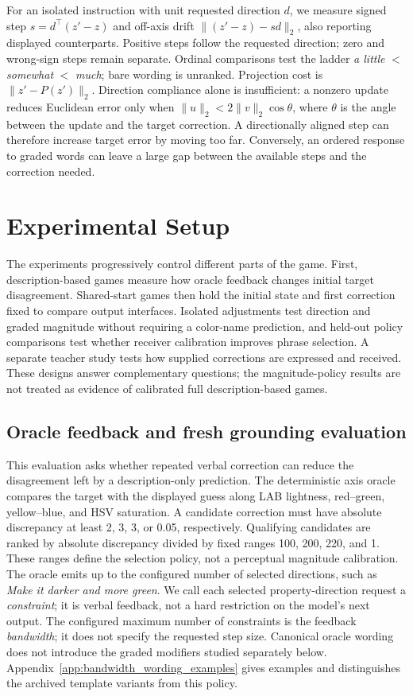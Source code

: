 \documentclass[11pt]{article}
\begin{document}
For an isolated instruction with unit requested direction $d$, we measure
signed step $s=d^\top(z'-z)$ and off-axis drift
$\|(z'-z)-sd\|_2$, also reporting displayed counterparts.
Positive steps follow the requested direction; zero and wrong-sign steps
remain separate. Ordinal comparisons test the ladder
\emph{a little} $<$ \emph{somewhat} $<$ \emph{much}; bare wording is unranked.
Projection cost is $\|z'-P(z')\|_2$.
Direction compliance alone is insufficient: a nonzero update reduces
Euclidean error only when $\|u\|_2<2\|v\|_2\cos\theta$, where $\theta$
is the angle between the update and the target correction.
A directionally aligned step can therefore increase target error by
moving too far. Conversely, an ordered response to graded words can
leave a large gap between the available steps and the correction needed.

\section{Experimental Setup}
\label{sec:experimental_setup}

The experiments progressively control different parts of the game.
First, description-based games measure how oracle feedback changes
initial target disagreement. Shared-start games then hold the initial
state and first correction fixed to compare output interfaces. Isolated
adjustments test direction and graded magnitude without requiring a
color-name prediction, and held-out policy comparisons test whether
receiver calibration improves phrase selection. A separate teacher study
tests how supplied corrections are expressed and received. These designs
answer complementary questions; the magnitude-policy results are not
treated as evidence of calibrated full description-based games.

\subsection{Oracle feedback and fresh grounding evaluation}
This evaluation asks whether repeated verbal correction can reduce the
disagreement left by a description-only prediction. The deterministic
axis oracle compares the target with the displayed guess along LAB
lightness, red--green, yellow--blue, and HSV saturation. A candidate
correction must have absolute discrepancy at least 2, 3, 3, or 0.05,
respectively. Qualifying candidates are ranked by absolute discrepancy
divided by fixed ranges 100, 200, 220, and 1. These ranges define the
selection policy, not a perceptual magnitude calibration.
The oracle emits up to the configured number of selected directions,
such as \textit{Make it darker and more green}. We call each selected
property-direction request a \emph{constraint}; it is verbal feedback,
not a hard restriction on the model's next output. The configured maximum
number of constraints is the feedback \emph{bandwidth}; it does not
specify the requested step size.
Canonical oracle wording does not introduce the graded modifiers studied
separately below. Appendix~\ref{app:bandwidth_wording_examples} gives
examples and distinguishes the archived template variants from this policy.
\end{document}
